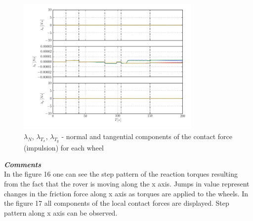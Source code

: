 \begin{figure}[H]
  \centering
    \includegraphics[width=0.8\textwidth]{lambdaNTS3}
  \caption{$\lambda_{N}$, $\lambda_{T_{x}}$, $\lambda_{T_{y}}$ - normal and tangential components of the contact force (impulsion) for each wheel}
\end{figure}

\noindent \textbf{\textit{\Large{Comments}}}\\[1mm]
\noindent In the figure 16 one can see the step pattern of the reaction torques resulting from the fact that the rover is moving along the x axis. Jumps in value represent changes in the friction force along x axis as torques 
are applied to the wheels. In the figure 17 all components of the local contact forces are displayed. Step pattern along x axis can be observed.
